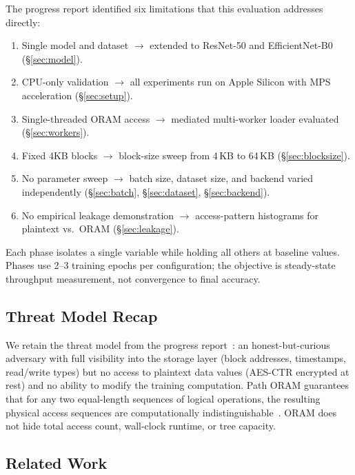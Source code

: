 \documentclass[11pt]{article}
\begin{document}
The progress report identified six limitations that this evaluation addresses directly:
\begin{enumerate}[label=(\arabic*), nosep]
    \item Single model and dataset $\to$ extended to ResNet-50 and EfficientNet-B0 (\S\ref{sec:model}).
    \item CPU-only validation $\to$ all experiments run on Apple Silicon with MPS acceleration (\S\ref{sec:setup}).
    \item Single-threaded ORAM access $\to$ mediated multi-worker loader evaluated (\S\ref{sec:workers}).
    \item Fixed 4KB blocks $\to$ block-size sweep from 4\,KB to 64\,KB (\S\ref{sec:blocksize}).
    \item No parameter sweep $\to$ batch size, dataset size, and backend varied independently (\S\ref{sec:batch}, \S\ref{sec:dataset}, \S\ref{sec:backend}).
    \item No empirical leakage demonstration $\to$ access-pattern histograms for plaintext vs.\ ORAM (\S\ref{sec:leakage}).
\end{enumerate}

Each phase isolates a single variable while holding all others at baseline values.
Phases use 2--3 training epochs per configuration; the objective is steady-state throughput measurement, not convergence to final accuracy.

\subsection*{Threat Model Recap}

We retain the threat model from the progress report~\cite{mid}: an honest-but-curious adversary with full visibility into the storage layer (block addresses, timestamps, read/write types) but no access to plaintext data values (AES-CTR encrypted at rest) and no ability to modify the training computation.
Path ORAM guarantees that for any two equal-length sequences of logical operations, the resulting physical access sequences are computationally indistinguishable~\cite{stefanov2013}.
ORAM does not hide total access count, wall-clock runtime, or tree capacity.

\subsection*{Related Work}
\end{document}
